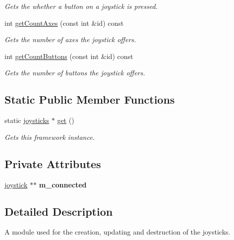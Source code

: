 \begin{DoxyCompactItemize}
\begin{DoxyCompactList}\small\item\em Gets the whether a button on a joystick is pressed. \end{DoxyCompactList}\item 
int \hyperlink{classflounder_1_1joysticks_a6c40b337283dcedf290c7f60d2eebd21}{get\+Count\+Axes} (const int \&id) const
\begin{DoxyCompactList}\small\item\em Gets the number of axes the joystick offers. \end{DoxyCompactList}\item 
int \hyperlink{classflounder_1_1joysticks_a3023745d58680e4efb7650198eebc4ed}{get\+Count\+Buttons} (const int \&id) const
\begin{DoxyCompactList}\small\item\em Gets the number of buttons the joystick offers. \end{DoxyCompactList}\end{DoxyCompactItemize}
\subsection*{Static Public Member Functions}
\begin{DoxyCompactItemize}
\item 
static \hyperlink{classflounder_1_1joysticks}{joysticks} $\ast$ \hyperlink{classflounder_1_1joysticks_a2c47c69053bf582ee6eb22d135d71084}{get} ()
\begin{DoxyCompactList}\small\item\em Gets this framework instance. \end{DoxyCompactList}\end{DoxyCompactItemize}
\subsection*{Private Attributes}
\begin{DoxyCompactItemize}
\item 
\mbox{\label{classflounder_1_1joysticks_a9000954268ff0dc151b34904514e2942}} 
\hyperlink{structflounder_1_1joysticks_1_1joystick}{joystick} $\ast$$\ast$ {\bfseries m\+\_\+connected}
\end{DoxyCompactItemize}


\subsection{Detailed Description}
A module used for the creation, updating and destruction of the joysticks. 



